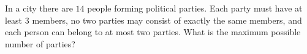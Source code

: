 In a city there are $14$ people forming political parties. Each party must have at least $3$ members, no two parties may consist of exactly the same members, and each person can belong to at most two parties. What is the maximum possible number of parties?
